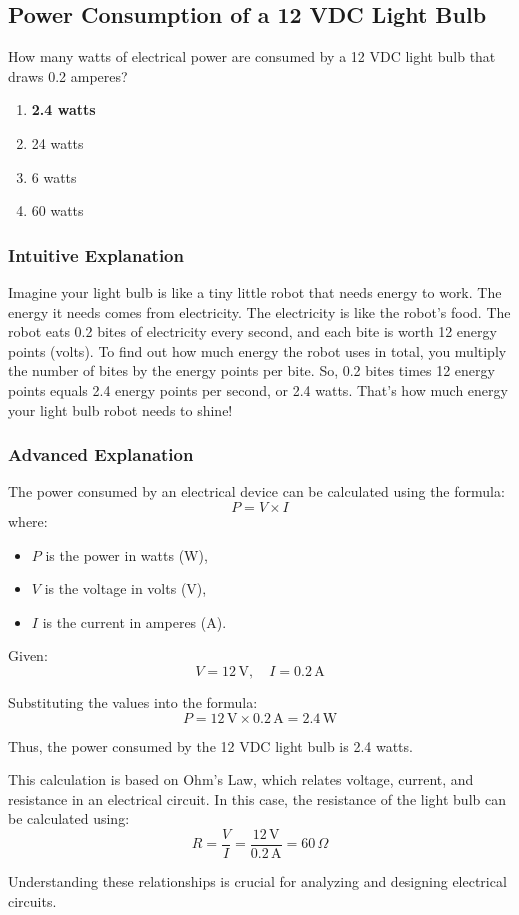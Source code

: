 \subsection{Power Consumption of a 12 VDC Light Bulb}
\label{G5B04}

\begin{tcolorbox}[colback=gray!10!white,colframe=black!75!black,title=G5B04]
How many watts of electrical power are consumed by a 12 VDC light bulb that draws 0.2 amperes?
\begin{enumerate}[label=\Alph*)]
    \item \textbf{2.4 watts}
    \item 24 watts
    \item 6 watts
    \item 60 watts
\end{enumerate}
\end{tcolorbox}

\subsubsection{Intuitive Explanation}
Imagine your light bulb is like a tiny little robot that needs energy to work. The energy it needs comes from electricity. The electricity is like the robot's food. The robot eats 0.2 bites of electricity every second, and each bite is worth 12 energy points (volts). To find out how much energy the robot uses in total, you multiply the number of bites by the energy points per bite. So, 0.2 bites times 12 energy points equals 2.4 energy points per second, or 2.4 watts. That's how much energy your light bulb robot needs to shine!

\subsubsection{Advanced Explanation}
The power consumed by an electrical device can be calculated using the formula:
\[
P = V \times I
\]
where:
\begin{itemize}
    \item \( P \) is the power in watts (W),
    \item \( V \) is the voltage in volts (V),
    \item \( I \) is the current in amperes (A).
\end{itemize}

Given:
\[
V = 12 \, \text{V}, \quad I = 0.2 \, \text{A}
\]

Substituting the values into the formula:
\[
P = 12 \, \text{V} \times 0.2 \, \text{A} = 2.4 \, \text{W}
\]

Thus, the power consumed by the 12 VDC light bulb is 2.4 watts.

This calculation is based on Ohm's Law, which relates voltage, current, and resistance in an electrical circuit. In this case, the resistance of the light bulb can be calculated using:
\[
R = \frac{V}{I} = \frac{12 \, \text{V}}{0.2 \, \text{A}} = 60 \, \Omega
\]

Understanding these relationships is crucial for analyzing and designing electrical circuits.

